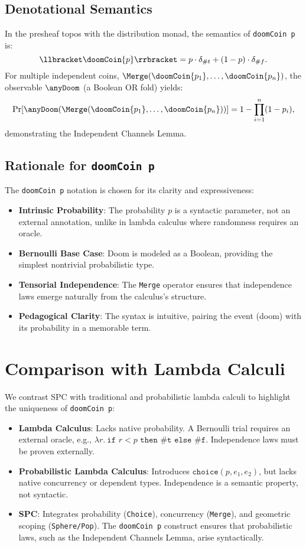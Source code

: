 \documentclass{article}
\begin{document}
\subsection{Denotational Semantics}
In the presheaf topos with the distribution monad, the semantics of \texttt{doomCoin p} is:
\[
\llbracket \doomCoin{p} \rrbracket = p \cdot \delta_{\#t} + (1-p) \cdot \delta_{\#f}.
\]
For multiple independent coins, $\Merge(\doomCoin{p_1}, \ldots, \doomCoin{p_n})$, the observable $\anyDoom$ (a Boolean OR fold) yields:
\[
\Pr[\anyDoom(\Merge(\doomCoin{p_1}, \ldots, \doomCoin{p_n}))] = 1 - \prod_{i=1}^n (1-p_i),
\]
demonstrating the Independent Channels Lemma.

\subsection{Rationale for \texttt{doomCoin p}}
The \texttt{doomCoin p} notation is chosen for its clarity and expressiveness:
\begin{itemize}
    \item \textbf{Intrinsic Probability}: The probability $p$ is a syntactic parameter, not an external annotation, unlike in lambda calculus where randomness requires an oracle.
    \item \textbf{Bernoulli Base Case}: Doom is modeled as a Boolean, providing the simplest nontrivial probabilistic type.
    \item \textbf{Tensorial Independence}: The \texttt{Merge} operator ensures that independence laws emerge naturally from the calculus’s structure.
    \item \textbf{Pedagogical Clarity}: The syntax is intuitive, pairing the event (doom) with its probability in a memorable term.
\end{itemize}

\section{Comparison with Lambda Calculi}
We contrast SPC with traditional and probabilistic lambda calculi to highlight the uniqueness of \texttt{doomCoin p}:

\begin{itemize}
    \item \textbf{Lambda Calculus}: Lacks native probability. A Bernoulli trial requires an external oracle, e.g., $\lambda r.\ \texttt{if } r < p \texttt{ then \#t else \#f}$. Independence laws must be proven externally.
    \item \textbf{Probabilistic Lambda Calculus}: Introduces $\texttt{choice}(p, e_1, e_2)$, but lacks native concurrency or dependent types. Independence is a semantic property, not syntactic.
    \item \textbf{SPC}: Integrates probability (\texttt{Choice}), concurrency (\texttt{Merge}), and geometric scoping (\texttt{Sphere/Pop}). The \texttt{doomCoin p} construct ensures that probabilistic laws, such as the Independent Channels Lemma, arise syntactically.
\end{itemize}
\end{document}
